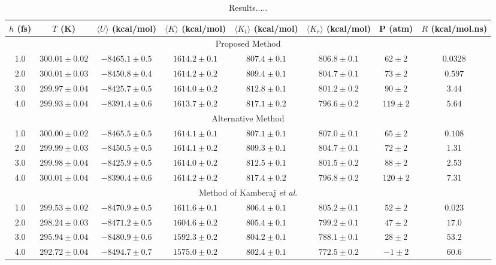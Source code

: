 \documentclass[journal=jctcce,manuscript=article,layout=twocolumn]{achemso}
\newcommand{\timestep}{h}
\begin{document}
\begin{table}
\caption{Results.....}
\label{table:proposed_method}
\begin{tabular}{cccccccc}
$\timestep$ (fs) & $T$ (K) & $\langle U\rangle$ (kcal/mol) & $\langle K\rangle$ (kcal/mol) & $\langle K_t\rangle$ (kcal/mol) & $\langle K_r\rangle$ (kcal/mol) & P (atm) & $R$ (kcal/mol.ns) \\

\hline
\multicolumn{8}{c}{Proposed Method} \\
1.0 & $300.01\pm0.02$ & $-8465.1\pm0.5$ & $1614.2\pm0.1$ & $807.4\pm0.1$ & $806.8\pm0.1$ & $62\pm2$ & $0.0328$ \\
2.0 & $300.01\pm0.03$ & $-8450.8\pm0.4$ & $1614.2\pm0.2$ & $809.4\pm0.1$ & $804.7\pm0.1$ & $73\pm2$ & $0.597$ \\
3.0 & $299.97\pm0.04$ & $-8425.7\pm0.5$ & $1614.0\pm0.2$ & $812.8\pm0.1$ & $801.2\pm0.2$ & $90\pm2$ & $3.44$ \\
4.0 & $299.93\pm0.04$ & $-8391.4\pm0.6$ & $1613.7\pm0.2$ & $817.1\pm0.2$ & $796.6\pm0.2$ & $119\pm2$ & $5.64$ \\

\hline
\multicolumn{8}{c}{Alternative Method} \\
1.0 & $300.00\pm0.02$ & $-8465.5\pm0.5$ & $1614.1\pm0.1$ & $807.1\pm0.1$ & $807.0\pm0.1$ & $65\pm2$ & $0.108$ \\
2.0 & $299.99\pm0.03$ & $-8450.5\pm0.5$ & $1614.1\pm0.2$ & $809.3\pm0.1$ & $804.7\pm0.1$ & $72\pm2$ & $1.31$ \\
3.0 & $299.98\pm0.04$ & $-8425.9\pm0.5$ & $1614.0\pm0.2$ & $812.5\pm0.1$ & $801.5\pm0.2$ & $88\pm2$ & $2.53$ \\
4.0 & $300.01\pm0.04$ & $-8390.4\pm0.6$ & $1614.2\pm0.2$ & $817.4\pm0.2$ & $796.8\pm0.2$ & $120\pm2$ & $7.31$ \\

\hline
\multicolumn{8}{c}{Method of Kamberaj \textit{et al}.\cite{Kamberaj_2005}} \\
1.0 & $299.53\pm0.02$ & $-8470.9\pm0.5$ & $1611.6\pm0.1$ & $806.4\pm0.1$ & $805.2\pm0.1$ & $52\pm2$ & $0.023$ \\
2.0 & $298.24\pm0.03$ & $-8471.2\pm0.5$ & $1604.6\pm0.2$ & $805.4\pm0.1$ & $799.2\pm0.1$ & $47\pm2$ & $17.0$ \\
3.0 & $295.94\pm0.04$ & $-8480.9\pm0.6$ & $1592.3\pm0.2$ & $804.2\pm0.1$ & $788.1\pm0.1$ & $28\pm2$ & $53.2$ \\
4.0 & $292.72\pm0.04$ & $-8494.7\pm0.7$ & $1575.0\pm0.2$ & $802.4\pm0.1$ & $772.5\pm0.2$ & $-1\pm2$ & $60.6$ \\


\end{tabular}
\end{table}
\end{document}
